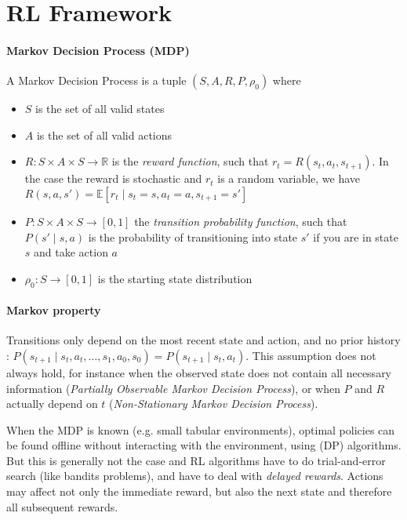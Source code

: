 \section{RL Framework}

\paragraph{Markov Decision Process (MDP)}
A Markov Decision Process is a tuple $(S, A, R, P, \rho_0)$ where 
\begin{itemize}
    \item $S$ is the set of all valid states
    \item $A$ is the set of all valid actions
    \item $R: S \times A \times S \rightarrow \mathbb{R}$ is the \emph{reward function}, such that $r_t = R(s_t, a_t, s_{t+1})$. In the case the reward is stochastic and $r_t$ is a random variable, we have $R(s, a, s') = \mathbb{E}[r_t \mid s_t=s, a_t=a, s_{t+1}=s']$
    \item $P: S \times A \times S \rightarrow [0, 1]$ the \emph{transition probability function}, such that $P(s' \mid s, a)$ is the probability of transitioning into state $s'$ if you are in state $s$ and take action $a$
    \item $\rho_0: S \rightarrow [0, 1]$ is the starting state distribution
\end{itemize}

\paragraph{Markov property} Transitions only depend on the most recent state and action, and no prior history : $P(s_{t+1}\mid s_t,a_t,\dots,s_1,a_0,s_0) = P(s_{t+1}\mid s_t,a_t)$. This assumption does not always hold, for instance when the observed state does not contain all necessary information (\emph{Partially Observable Markov Decision Process}), or when $P$ and $R$ actually depend on $t$ (\emph{Non-Stationary Markov Decision Process}).

When the MDP is known (e.g. small tabular environments), optimal policies can be found offline without interacting with the environment, using  (DP) algorithms. But this is generally not the case and RL algorithms have to do trial-and-error search (like bandits problems), and have to deal with \emph{delayed rewards}. Actions may affect not only the immediate reward, but also the next state and therefore all subsequent rewards.

